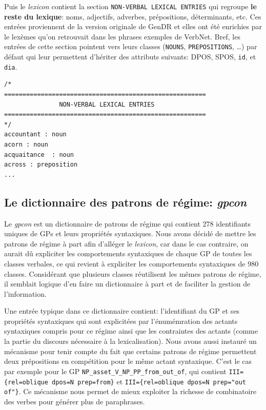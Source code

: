 Puis le \emph{lexicon} contient la section \texttt{NON-VERBAL LEXICAL ENTRIES} qui regroupe \textbf{le reste du lexique}: noms, adjectifs, adverbes, prépositions, déterminants, etc. Ces entrées proviennent de la version originale de GenDR \citep{lareau18} et elles ont été enrichies par le lexèmes qu'on retrouvait dans les phrases exemples de VerbNet. Bref, les entrées de cette section pointent vers leurs classes (\texttt{NOUNS}, \texttt{PREPOSITIONS}, \ldots) par défaut qui leur permettent d'hériter des attributs suivants: \ac{DPOS}, \ac{SPOS}, \texttt{id}, et \texttt{dia}.

\begin{lstlisting}[language=mate, caption = Extrait du \emph{lexicon}: unités lexicales non-verbales]
/*
=======================================================
               NON-VERBAL LEXICAL ENTRIES     
=======================================================
*/
accountant : noun
acorn : noun
acquaitance  : noun
across : preposition
...
\end{lstlisting}

\subsection{Le dictionnaire des patrons de régime: \emph{gpcon}}

Le \emph{gpcon} est un dictionnaire de patrons de régime qui contient 278 identifiants uniques de \acp{GP} et leurs propriétés syntaxiques. Nous avons décidé de mettre les patrons de régime à part afin d'alléger le \emph{lexicon}, car dans le cas contraire, on aurait dû expliciter les comportements syntaxiques de chaque \ac{GP} de toutes les classes verbales, ce qui revient à expliciter les comportements syntaxiques de 980 classes. Considérant que plusieurs classes réutilisent les mêmes patrons de régime, il semblait logique d'en faire un dictionnaire à part et de faciliter la gestion de l'information.

Une entrée typique dans ce dictionnaire contient: l'identifiant du \ac{GP} et ses propriétés syntaxiques qui sont explicitées par l'énumémration des actants syntaxiques compris pour ce régime ainsi que les contraintes des actants (comme la partie du discours nécessaire à la lexicalisation). Nous avons aussi instauré un mécanisme pour tenir compte du fait que certains patrons de régime permettent deux prépositions en compétition pour le même actant syntaxique. C'est le cas par exemple pour le \ac{GP} \texttt{NP\_asset\_V\_NP\_PP\_from\_out\_of}, qui contient \lstinline|III={rel=oblique dpos=N prep=from}| et \lstinline|III={rel=oblique dpos=N prep="out of"}|. Ce mécanisme nous permet de mieux exploiter la richesse de combinatoire des verbes pour générer plus de paraphrases.

